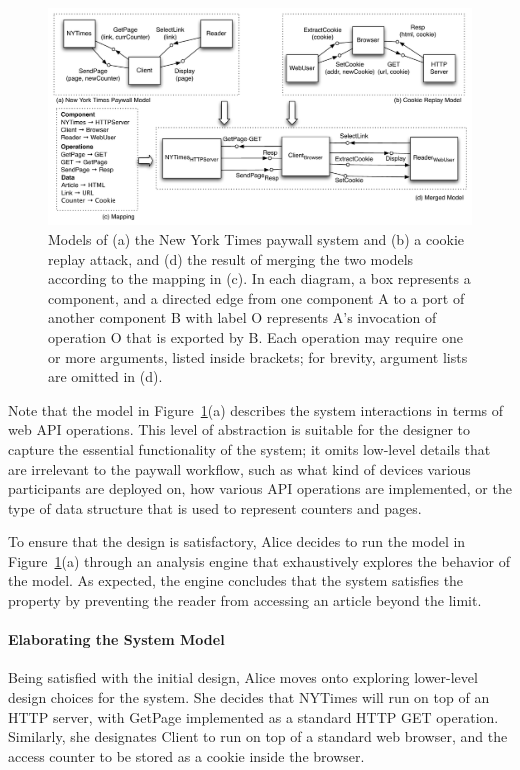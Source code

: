 \begin{figure}[!t]
\centering
\includegraphics[width=1.0\textwidth]{diagrams/nytimes}
\caption{Models of (a) the New York Times paywall system and (b) a
  cookie replay attack, and (d) the result of merging the two models
  according to the mapping in (c). In each diagram, a box represents a
  component, and a directed edge from one component \textsf{A} to a
  port of another component \textsf{B} with label \textsf{O}
  represents \textsf{A}'s invocation of operation \textsf{O} that is
  exported by \textsf{B}. Each operation may require one or more
  arguments, listed inside brackets; for brevity, argument lists are
  omitted in (d).}
\label{fig-nytimes}
\end{figure}

Note that the model in Figure~\ref{fig-nytimes}(a) describes the system
interactions in terms of web API operations. This level of abstraction
is suitable for the designer to capture the essential functionality of
the system; it omits low-level details that are irrelevant to the
paywall workflow, such as what kind of devices various participants
are deployed on, how various API operations are implemented, or the
type of data structure that is used to represent counters and pages.

To ensure that the design is satisfactory, Alice decides to run the
model in Figure~\ref{fig-nytimes}(a) through an analysis engine that
exhaustively explores the behavior of the model. As expected, the
engine concludes that the system satisfies the property by preventing
the reader from accessing an article beyond the limit.

\paragraph{\textbf{Elaborating the System Model}} Being satisfied with the
initial design, Alice moves onto exploring lower-level design
choices for the system. She decides that \textsf{NYTimes} will run on
top of an HTTP server, with \textsf{GetPage} implemented as a
standard HTTP GET operation. Similarly, she
designates \textsf{Client} to run on top of a standard web browser,
and the access counter to be stored as a cookie inside the browser.


